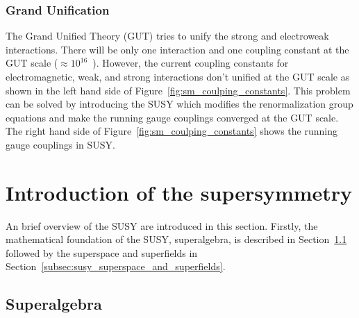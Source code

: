
\subsubsection{Grand Unification}
\label{subsubsec:susy_gut}
The Grand Unified Theory (GUT) tries to unify the strong and electroweak interactions.
There will be only one interaction and one coupling constant at the GUT scale ($\approx 10^{16}$~{\GeV}).
However, the current coupling constants for electromagnetic, weak, and strong interactions don't unified at the GUT scale as shown in the left hand side of Figure~\ref{fig:sm_coulping_constants}.
This problem can be solved by introducing the SUSY which modifies the renormalization group equations and make the running gauge couplings converged at the GUT scale.
The right hand side of Figure~\ref{fig:sm_coulping_constants} shows the running gauge couplings in SUSY.


\section{Introduction of the supersymmetry}
\label{sec:susy_intro}
An brief overview of the SUSY are introduced in this section.
Firstly, the mathematical foundation of the SUSY, superalgebra, is described in Section~\ref{subsec:susy_superalgebra} followed by the superspace and superfields in Section~\ref{subsec:susy_superspace_and_superfields}.


\subsection{Superalgebra}
\label{subsec:susy_superalgebra}


